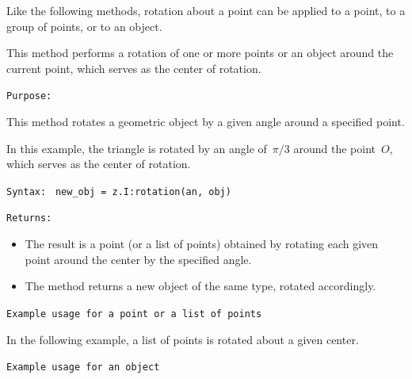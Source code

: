 Like the following methods, rotation about a point can be applied to a point, to a group of points, or to an object.

This method performs a rotation of one or more points or an object around the current point, which serves as the center of rotation.


\medskip
\texttt{Purpose:}

This method rotates a geometric object by a given angle around a specified point.

In this example, the triangle is rotated by an angle of~$\pi/3$ around the point~$O$, which serves as the center of rotation.


\medskip
\texttt{Syntax: } \verb|new_obj = z.I:rotation(an, obj)|


\medskip
\texttt{Returns:}
\begin{itemize}
\item The result is a point (or a list of points) obtained by rotating each given point around the center by the specified angle.
\item The method returns a new object of the same type, rotated accordingly.
\end{itemize}


\medskip
\texttt{Example usage for a point or a list of points}

In the following example, a list of points is rotated about a given center.

\vspace{1em}

\begin{tkzexample}[latex=7cm]
\begin{center}
\end{center}
\end{tkzexample}

\medskip
\texttt{Example usage for an object}

